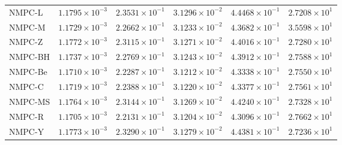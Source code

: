 \begin{tabular}{lccccc}
NMPC-L & $1.1795\times10^{-3}$ & $2.3531\times10^{-1}$ & $3.1296\times10^{-2}$ & $4.4468\times10^{-1}$ & $2.7208\times10^{1}$ \\
NMPC-M & $1.1729\times10^{-3}$ & $2.2662\times10^{-1}$ & $3.1233\times10^{-2}$ & $4.3682\times10^{-1}$ & $3.5598\times10^{1}$ \\
NMPC-Z & $1.1772\times10^{-3}$ & $2.3115\times10^{-1}$ & $3.1271\times10^{-2}$ & $4.4016\times10^{-1}$ & $2.7280\times10^{1}$ \\
NMPC-BH & $1.1737\times10^{-3}$ & $2.2769\times10^{-1}$ & $3.1243\times10^{-2}$ & $4.3912\times10^{-1}$ & $2.7588\times10^{1}$ \\
NMPC-Be & $1.1710\times10^{-3}$ & $2.2287\times10^{-1}$ & $3.1212\times10^{-2}$ & $4.3338\times10^{-1}$ & $2.7550\times10^{1}$ \\
NMPC-C & $1.1719\times10^{-3}$ & $2.2388\times10^{-1}$ & $3.1220\times10^{-2}$ & $4.3377\times10^{-1}$ & $2.7561\times10^{1}$ \\
NMPC-MS & $1.1764\times10^{-3}$ & $2.3144\times10^{-1}$ & $3.1269\times10^{-2}$ & $4.4240\times10^{-1}$ & $2.7328\times10^{1}$ \\
NMPC-R & $1.1705\times10^{-3}$ & $2.2131\times10^{-1}$ & $3.1204\times10^{-2}$ & $4.3096\times10^{-1}$ & $2.7662\times10^{1}$ \\
NMPC-Y & $1.1773\times10^{-3}$ & $2.3290\times10^{-1}$ & $3.1279\times10^{-2}$ & $4.4381\times10^{-1}$ & $2.7236\times10^{1}$ \\
\hline
\end{tabular}

